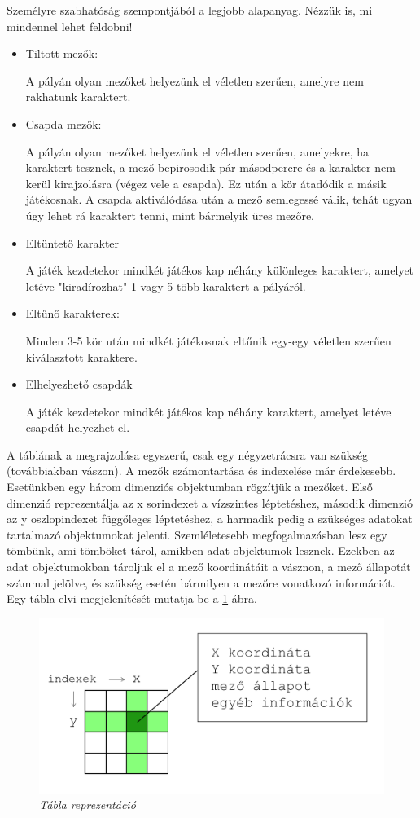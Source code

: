 Személyre szabhatóság szempontjából a legjobb alapanyag. Nézzük is, mi mindennel lehet feldobni!
\begin{itemize}
	
	\item Tiltott mezők:
	
	A pályán olyan mezőket helyezünk el véletlen szerűen, amelyre nem rakhatunk karaktert.
	\item Csapda mezők:
	
	A pályán olyan mezőket helyezünk el véletlen szerűen, amelyekre, ha karaktert tesznek, a mező bepirosodik pár másodpercre és a karakter nem kerül kirajzolásra (végez vele a csapda). Ez után a kör átadódik a másik játékosnak. A csapda aktiválódása után a mező semlegessé válik, tehát ugyan úgy lehet rá karaktert tenni, mint bármelyik üres mezőre.
	\item Eltüntető karakter
	
	A játék kezdetekor mindkét játékos kap néhány különleges karaktert, amelyet letéve "kiradírozhat" 1 vagy 5 több karaktert a pályáról.
	\item Eltűnő karakterek:
	
	Minden 3-5 kör után mindkét játékosnak eltűnik egy-egy véletlen szerűen kiválasztott karaktere.	
	\item Elhelyezhető csapdák
	
	A játék kezdetekor mindkét játékos kap néhány karaktert, amelyet letéve csapdát helyezhet el.	
\end{itemize}


A táblának a megrajzolása egyszerű, csak egy négyzetrácsra van szükség (továbbiakban vászon). A mezők számontartása és indexelése már érdekesebb. Esetünkben egy három dimenziós objektumban rögzítjük a mezőket. Első dimenzió reprezentálja az x sorindexet a vízszintes léptetéshez, második dimenzió az y oszlopindexet függőleges léptetéshez, a harmadik pedig a szükséges adatokat tartalmazó objektumokat jelenti. Szemléletesebb megfogalmazásban lesz egy tömbünk, ami tömböket tárol, amikben adat objektumok lesznek. Ezekben az adat objektumokban tároljuk el a mező koordinátáit a vásznon, a mező állapotát számmal jelölve, és szükség esetén bármilyen a mezőre vonatkozó információt. Egy tábla elvi megjelenítését mutatja be a \ref{fig:field-repr} ábra.

\begin{figure}[!h]
	\centering
	\includegraphics[width=0.6\linewidth]{kepek/field-representation.png}
	\caption{\textit{Tábla reprezentáció}}
	\label{fig:field-repr}
\end{figure}

